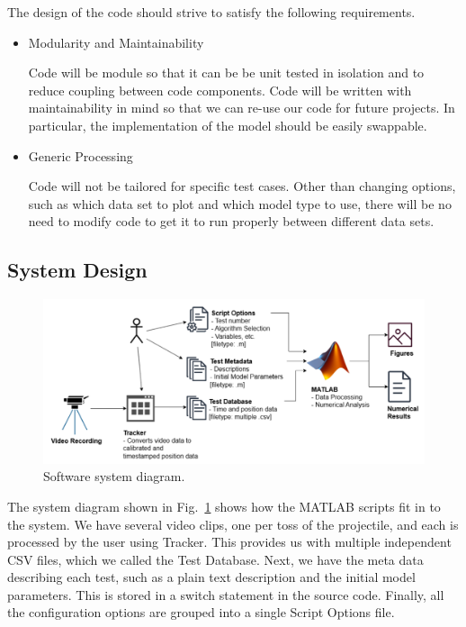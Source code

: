 The design of the code should strive to satisfy the following requirements.

\begin{itemize}

\item Modularity and Maintainability

Code will be module so that it can be be unit tested in isolation and to reduce coupling between code components. Code will be written with maintainability in mind so that we can re-use our code for future projects. In particular, the implementation of the model should be easily swappable. 

\item Generic Processing 

Code will not be tailored for specific test cases. Other than changing options, such as which data set to plot and which model type to use, there will be no need to modify code to get it to run properly between different data sets.

\end{itemize}

\subsection{System Design}
\begin{figure}[t]
\centering
\includegraphics[width=0.9\linewidth]{images/SystemDiagram.png}
\caption{\label{fig:SystemDiagram} Software system diagram.}
\end{figure}

The system diagram shown in Fig.~\ref{fig:SystemDiagram} shows how the MATLAB scripts fit in to the system. We have several video clips, one per toss of the projectile, and each is processed by the user using Tracker. This provides us with multiple independent CSV files, which we called the Test Database. Next, we have the meta data describing each test, such as a plain text description and the initial model parameters. This is stored in a switch statement in the source code. Finally, all the configuration options are grouped into a single Script Options file. 

